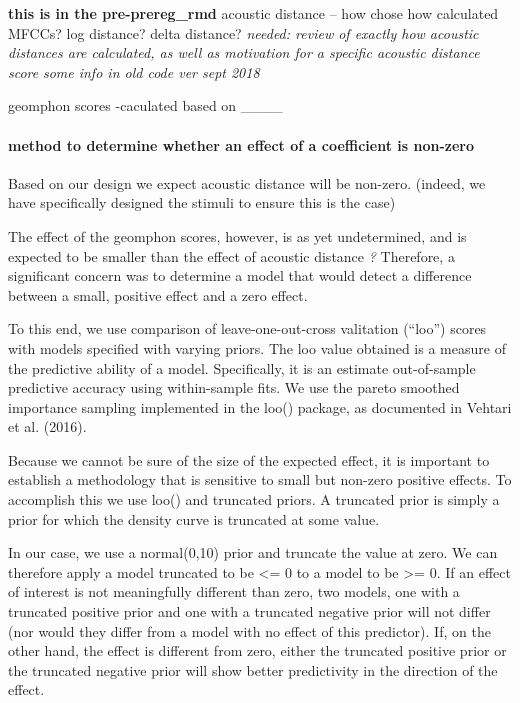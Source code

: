 \documentclass[]{article}
\let\oldparagraph\paragraph
\renewcommand{\paragraph}[1]{\oldparagraph{#1}\mbox{}}
\begin{document}
\textbf{this is in the pre-prereg\_rmd} acoustic distance -- how chose
how calculated MFCCs? log distance? delta distance? \emph{needed: review
of exactly how acoustic distances are calculated, as well as motivation
for a specific acoustic distance score} \emph{some info in old code ver
sept 2018 }

geomphon scores -caculated based on \_\_\_\_

\hypertarget{method-to-determine-whether-an-effect-of-a-coefficient-is-non-zero}{%
\paragraph{method to determine whether an effect of a coefficient is
non-zero}\label{method-to-determine-whether-an-effect-of-a-coefficient-is-non-zero}}

Based on our design we expect acoustic distance will be non-zero.
(indeed, we have specifically designed the stimuli to ensure this is the
case)

The effect of the geomphon scores, however, is as yet undetermined, and
is expected to be smaller than the effect of acoustic distance \emph{?}
Therefore, a significant concern was to determine a model that would
detect a difference between a small, positive effect and a zero effect.

To this end, we use comparison of leave-one-out-cross valitation
(``loo'') scores with models specified with varying priors. The loo
value obtained is a measure of the predictive ability of a model.
Specifically, it is an estimate out-of-sample predictive accuracy using
within-sample fits. We use the pareto smoothed importance sampling
implemented in the loo() package, as documented in Vehtari et al.
(2016).

Because we cannot be sure of the size of the expected effect, it is
important to establish a methodology that is sensitive to small but
non-zero positive effects. To accomplish this we use loo() and truncated
priors. A truncated prior is simply a prior for which the density curve
is truncated at some value.

In our case, we use a normal(0,10) prior and truncate the value at zero.
We can therefore apply a model truncated to be \textless{}= 0 to a model
to be \textgreater{}= 0. If an effect of interest is not meaningfully
different than zero, two models, one with a truncated positive prior and
one with a truncated negative prior will not differ (nor would they
differ from a model with no effect of this predictor). If, on the other
hand, the effect is different from zero, either the truncated positive
prior or the truncated negative prior will show better predictivity in
the direction of the effect.
\end{document}
